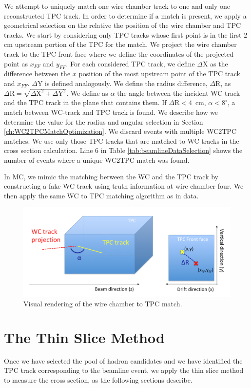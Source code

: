 We attempt to uniquely match one wire chamber track to one and only one reconstructed TPC track. 
In order to determine if a match is present, we apply a geometrical selection on the relative the position of the wire chamber and TPC tracks. 
We start by considering only TPC tracks whose first point is in the first 2 cm upstream portion of the TPC for the match.  We project the wire chamber track to the TPC front face where we define the coordinates of the projected point as  $x_{FF}$ and $y_{FF}$.  For each considered TPC track, we define $\Delta$X as the difference between the $x$ position of the most upstream point of the TPC track and $x_{FF}$.  $\Delta$Y is defined analogously. We define the radius difference, $\Delta$R, as $ \Delta \text{R} =  \sqrt{ \Delta \text{X}^2 +  \Delta \text{Y}^2}  $. We define  as $\alpha$ the angle between the incident WC track and the TPC track in the plane that contains them.  If  $\Delta \text{R} < 4 $~cm, $\alpha < 8^\circ $,  a match between WC-track and TPC track is found. We describe  how we determine the value for the radius and angular selection in Section \ref{ch:WC2TPCMatchOptimization}.
We discard events with multiple WC2TPC matches. We use only those TPC tracks that are matched to WC tracks in the cross section calculation. Line 6 in Table \ref{tab:beamlineDataSelection} shows the number of events where a unique WC2TPC match was found.

In MC, we mimic the matching between the WC and the TPC track by constructing a fake WC track using truth information at wire chamber four. We then apply the same WC to TPC matching algorithm as in data. 


\begin{figure}
  \centering  
\includegraphics[width=\textwidth]{Chapter-4/Images/WC2TPCMatchTracks.png}
\caption{Visual rendering of the wire chamber to TPC match.}
\label{fig:showerFilt}
\end{figure}

\section{The Thin Slice Method}\label{ch:ThinSliceMethod}
Once we have selected the pool of hadron candidates and we have identified the TPC track corresponding to the beamline event, we apply the thin slice method to measure the cross section, as the following sections describe. 
